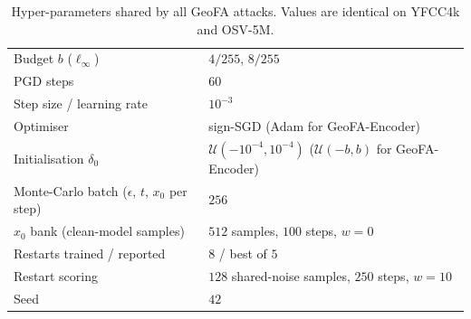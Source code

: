 \begin{table}[h]
\centering\small
\caption{Hyper-parameters shared by all GeoFA attacks. Values are identical on YFCC4k and
OSV-5M.}
\label{tab:hyperparams-shared}
\begin{tabular}{ll}
\toprule
Budget $b$ ($\ell_\infty$)                         & $4/255$, $8/255$ \\
PGD steps                                          & $60$ \\
Step size / learning rate                          & $10^{-3}$ \\
Optimiser                                          & sign-SGD (Adam for GeoFA-Encoder) \\
Initialisation $\delta_0$                          & $\mathcal{U}(-10^{-4},10^{-4})$
                                                     ($\mathcal{U}(-b,b)$ for GeoFA-Encoder) \\
Monte-Carlo batch ($\epsilon$, $t$, $x_0$ per step) & $256$ \\
$x_0$ bank (clean-model samples)                   & $512$ samples, $100$ steps, $w=0$ \\
Restarts trained / reported                        & $8$ / best of $5$ \\
Restart scoring                                    & $128$ shared-noise samples, $250$ steps, $w=10$ \\
Seed                                               & $42$ \\
\bottomrule
\end{tabular}
\end{table}

